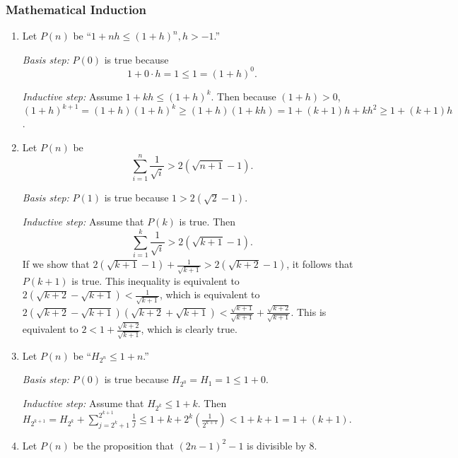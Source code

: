 \documentclass{../../cls/sig-alternate-05-2015}
\begin{document}
\subsubsection{Mathematical Induction}
\begin{enumerate}
\item Let $P(n)$ be ``$1 + nh \le (1 + h)^n, h > -1$.''

\textit{Basis step:} $P(0)$ is true because \begin{equation}
    1 + 0 \cdot h = 1 \le 1 = (1 + h)^0.
\end{equation}

\textit{Inductive step:} Assume $1 + kh \le (1 + h)^k$.
Then because $(1 + h) > 0$, $(1 + h)^{k + 1} = (1 + h) (1 + h) ^k \ge (1 + h)(1 + k h) = 1 + (k + 1) h + k h^2 \ge 1 + (k + 1) h$.

\item Let $P(n)$ be \begin{equation}
\sum_{i = 1}^{n} \frac{1}{\sqrt{i}} > 2(\sqrt{n + 1} - 1).
\end{equation}

\textit{Basis step:} $P(1)$ is true because $1 > 2 (\sqrt{2} - 1)$.

\textit{Inductive step:} Assume that $P(k)$ is true.
Then \begin{equation}
\sum_{i = 1}^{k} \frac{1}{\sqrt{i}} > 2(\sqrt{k + 1} - 1).
\end{equation}
If we show that $2(\sqrt{k + 1} - 1) + \frac{1}{\sqrt{k + 1}} > 2(\sqrt{k + 2} - 1)$,
it follows that $P(k + 1)$ is true.
This inequality is equivalent to $2(\sqrt{k + 2} - \sqrt{k + 1}) < \frac{1}{\sqrt{k + 1}}$,
which is equivalent to $2(\sqrt{k + 2} - \sqrt{k + 1}) (\sqrt{k + 2} + \sqrt{k + 1}) < \frac{\sqrt{k + 1}}{\sqrt{k + 1}} + \frac{\sqrt{k + 2}}{\sqrt{k + 1}}$.
This is equivalent to $2 < 1 + \frac{\sqrt{k + 2}}{\sqrt{k + 1}}$,
which is clearly true.

\item Let $P(n)$ be ``$H_{2^n} \le 1 + n$.''

\textit{Basis step:} $P(0)$ is true because $H_{2^0} = H_1 = 1 \le 1 + 0$.

\textit{Inductive step:} Assume that $H_{2^k} \le 1 + k$.
Then $H_{2^{k + 1}} = H_{2^k} + \sum_{j = 2^k + 1}^{2^{k + 1}} \frac{1}{j} \le 1 + k + 2^k \left(\frac{1}{2^{k + 1}}\right) < 1 + k + 1 = 1 + (k + 1)$.

\item Let $P(n)$ be the proposition that $(2n - 1)^2 - 1$ is divisible by
8.


\end{enumerate}
\end{document}
